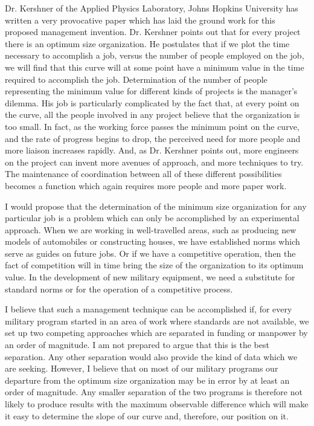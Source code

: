\documentclass{memoir}
\begin{document}
Dr. Kershner of the Applied Physics Laboratory, Johns Hopkins University has written a very provocative paper \cite{kershner}  which has laid the ground work for this proposed management invention. Dr. Kershner points out that for every project there is an optimum size organization. He postulates that if we plot the time necessary to accomplish a job, versus the number of people employed on the job, we will find that this curve will at some point have a minimum value in the time required to accomplish the job. Determination of the number of people representing the minimum value for different kinds of projects is the manager's dilemma. His job is particularly complicated by the fact that, at every point on the curve, all the people involved in any project believe that the organization is too small. In fact, as the working force passes the minimum point on the curve, and the rate of progress begins to drop, the perceived need for more people and more liaison increases rapidly. And, as Dr. Kershner points out, more engineers on the project can invent more avenues of approach, and more techniques to try. The maintenance of coordination between all of these different possibilities becomes a function which again requires more people and more paper work.

I would propose that the determination of the minimum size organization for any particular job is a problem which can only be accomplished by an experimental approach. When we are working in well-travelled areas, such as producing new models of automobiles or constructing houses, we have established norms which serve as guides on future jobs. Or if we have a competitive operation, then the fact of competition will in time bring the size of the organization to its optimum value. In the development of new military equipment, we need a substitute for standard norms or for the operation of a competitive process.

I believe that such a management technique can be accomplished if, for every military program started in an area of work where standards are not available, we set up two competing approaches which are separated in funding or manpower by an order of magnitude. I am not prepared to argue that this is the best separation. Any other separation would also provide the kind of data which we are seeking. However, I believe that on most of our military programs our departure from the optimum size organization may be in error by at least an order of magnitude. Any smaller separation of the two programs is therefore not likely to produce results with the maximum observable difference which will make it easy to determine the slope of our curve and, therefore, our position on it.
\end{document}
